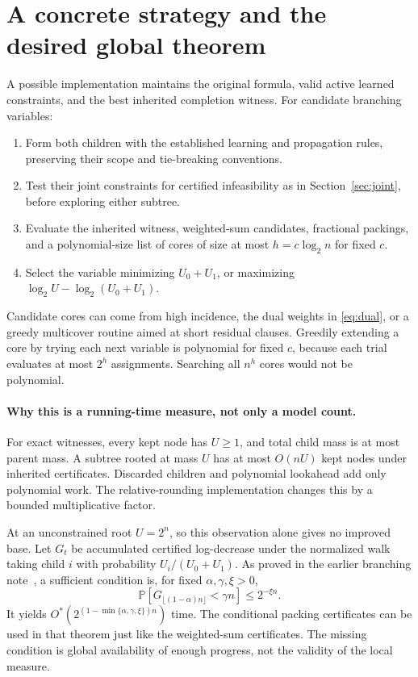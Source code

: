 \documentclass[11pt,a4paper]{article}
\theoremstyle{definition}
\theoremstyle{remark}
\newcommand{\Ostar}{O^{*}}
\newcommand{\Prb}{\mathbb P}
\begin{document}
\section{A concrete strategy and the desired global theorem}

A possible implementation maintains the original formula, valid active
learned constraints, and the best inherited completion witness.
For candidate branching variables:
\begin{enumerate}
\item Form both children with the established learning and propagation
rules, preserving their scope and tie-breaking conventions.
\item Test their joint constraints for certified infeasibility as in
Section~\ref{sec:joint}, before exploring either subtree.
\item Evaluate the inherited witness, weighted-sum candidates, fractional
packings, and a polynomial-size list of cores of size at most
$h=c\log_2 n$ for fixed $c$.
\item Select the variable minimizing $U_0+U_1$, or maximizing
$\log_2 U-\log_2(U_0+U_1)$.
\end{enumerate}
Candidate cores can come from high incidence, the dual weights in
\eqref{eq:dual}, or a greedy multicover routine aimed at short residual
clauses. Greedily extending a core by trying each next variable is
polynomial for fixed $c$, because each trial evaluates at most $2^h$
assignments. Searching all $n^h$ cores would not be polynomial.

\paragraph{Why this is a running-time measure, not only a model count.}
For exact witnesses, every kept node has $U\ge1$, and total child mass
is at most parent mass. A subtree rooted at mass $U$ has at most
$O(nU)$ kept nodes under inherited certificates. Discarded children and
polynomial lookahead add only polynomial work. The relative-rounding
implementation changes this by a bounded multiplicative factor.

At an unconstrained root $U=2^n$, so this observation alone gives no
improved base. Let $G_t$ be accumulated certified log-decrease under
the normalized walk taking child $i$ with probability
$U_i/(U_0+U_1)$. As proved in the earlier branching note~\cite{Frontier},
a sufficient condition is, for fixed $\alpha,\gamma,\xi>0$,
\[
 \Prb\left[G_{\lfloor(1-\alpha)n\rfloor}<\gamma n\right]
 \le2^{-\xi n}.
\]
It yields $\Ostar(2^{(1-\min\{\alpha,\gamma,\xi\})n})$ time.
The conditional packing certificates can be used in that theorem just
like the weighted-sum certificates. The missing condition is global
availability of enough progress, not the validity of the local measure.
\end{document}
